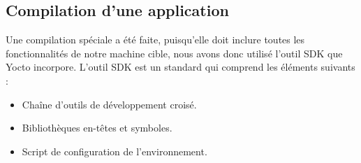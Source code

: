 \documentclass[letterpaper,10pt,french]{sphinxmanual}
\begin{document}
\subsection{Compilation d'une application}
\label{developpement:compilation-d-une-application}
Une compilation spéciale a été faite, puisqu'elle doit inclure toutes les fonctionnalités de notre machine cible, nous avons donc utilisé l'outil SDK que Yocto incorpore. L’outil SDK est un standard qui comprend les éléments suivants :
\begin{itemize}
\item {} 
Chaîne d'outils de développement croisé.

\item {} 
Bibliothèques en-têtes et symboles.

\item {} 
Script de configuration de l'environnement.

\end{itemize}
\end{document}
